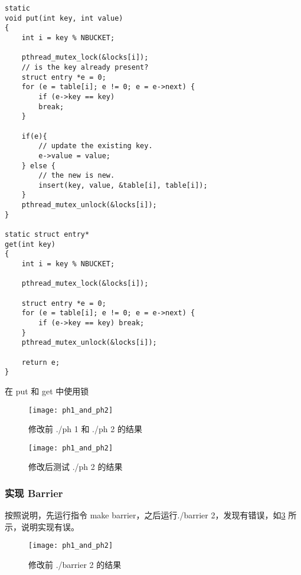 \begin{listing}[!htb]
	\begin{verbatim}
static 
void put(int key, int value)
{
    int i = key % NBUCKET;

    pthread_mutex_lock(&locks[i]);
    // is the key already present?
    struct entry *e = 0;
    for (e = table[i]; e != 0; e = e->next) {
        if (e->key == key)
        break;
    }

    if(e){
        // update the existing key.
        e->value = value;
    } else {
        // the new is new.
        insert(key, value, &table[i], table[i]);
    }
    pthread_mutex_unlock(&locks[i]);
}

static struct entry*
get(int key)
{
    int i = key % NBUCKET;

    pthread_mutex_lock(&locks[i]);
    
    struct entry *e = 0;
    for (e = table[i]; e != 0; e = e->next) {
        if (e->key == key) break;
    }
    pthread_mutex_unlock(&locks[i]);
    
    return e;
}
	\end{verbatim}
	\caption{在 put 和 get 中使用锁}\label{lst:use_lock_in_put_and_get}
\end{listing}

\begin{figure}[!htb]
	\centering
	\texttt{[image: ph1\_and\_ph2]}
	\caption{修改前 ./ph 1 和 ./ph 2 的结果}
	\label{fig:ph1_and_ph2}
\end{figure}

\begin{figure}[!htb]
	\centering
	\texttt{[image: ph1\_and\_ph2]}
	
	\caption{修改后测试 ./ph 2 的结果}
	\label{fig:test_using_threads}
\end{figure}

\subsubsection{实现 Barrier}

按照说明，先运行指令 make barrier，之后运行./barrier 2，发现有错误，如\cref{fig:barrier_error} 所示，说明实现有误。

\begin{figure}[!htb]
	\centering
	\texttt{[image: ph1\_and\_ph2]}
	\caption{修改前 ./barrier 2 的结果}
	\label{fig:barrier_error}
\end{figure}

